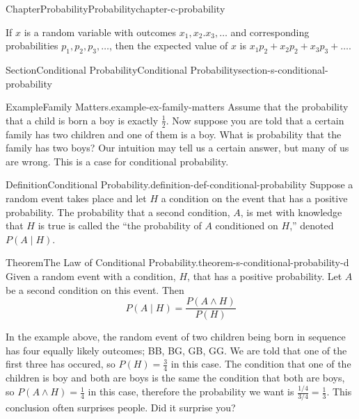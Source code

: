 \documentclass[oneside,10pt,]{book}
\numberwithin{equation}{section}
\begin{document}
\begin{chapterptx}{Chapter}{Probability}{}{Probability}{}{}{chapter-c-probability}
\renewcommand*{\chaptername}{Chapter}
\begin{introduction}{}%
If \(x\) is a random variable with outcomes \(x_1, x_2. x_3, \ldots\) and corresponding probabilities \(p_1, p_2, p_3, \ldots\), then the expected value of \(x\) is \(x_1p_2+ x_2p_2+ x_3p_3+\ldots\).%
\end{introduction}%
%
%
\typeout{************************************************}
\typeout{************************************************}
%
\begin{sectionptx}{Section}{Conditional Probability}{}{Conditional Probability}{}{}{section-s-conditional-probability}
\begin{example}{Example}{Family Matters.}{example-ex-family-matters}%
Assume that the probability that a child is born a boy is exactly \(\frac{1}{2}\).  Now suppose you are told that a certain family has two children and one of them is a boy.  What is probability that the family has two boys?  Our intuition may tell us a certain answer, but many of us are wrong. This is a case for conditional probability.%
\end{example}
\begin{definition}{Definition}{Conditional Probability.}{definition-def-conditional-probability}%
%
\label{notation-def-conditional-probability-c}%
Suppose a random event takes place and let \(H\) a condition on the event that has a positive probability. The probability that a second condition, \(A\), is met with knowledge that \(H\) is true is called the ``the probability of \(A\) conditioned on \(H\),'' denoted \(P(A \mid H)\).%
\end{definition}
\begin{theorem}{Theorem}{The Law of Conditional Probability.}{}{theorem-s-conditional-probability-d}%
Given a random event with a condition, \(H\), that has a positive probability. Let \(A\) be a second condition on this event.  Then%
\begin{equation*}
P(A \mid H)= \frac{P(A \wedge H)}{P(H)}
\end{equation*}
%
\end{theorem}
In the example above, the random event of two children being born in sequence has four equally likely outcomes; BB, BG, GB, GG.  We are told that one of the first three has occured, so \(P(H) =\frac{3}{4}\) in this case.   The condition that one of the children is boy and both are boys is the same the condition that both are boys, so \(P(A \wedge H) = \frac{1}{4}\) in this case, therefore the probability we want is \(\frac{1/4}{3/4} =\frac{1}{3}\).  This conclusion often surprises people.  Did it surprise you?%

\end{sectionptx}
\end{chapterptx}
\end{document}
